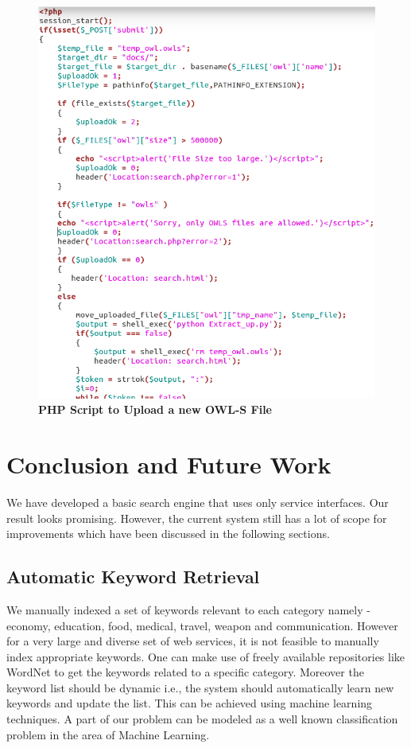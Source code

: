 \documentclass[12pt, twoside]{book}
\begin{document}
\begin{figure}[h]
 \centering
 \includegraphics[width=\textwidth]{pics/upload.png}
 \caption{\textbf{PHP Script to Upload a new OWL-S File}}
 \label{fig: upload}
\end{figure}


\chapter{Conclusion and Future Work}
We have developed a basic search engine that uses only service interfaces. Our result looks promising. However, the current system still has a lot of scope for improvements which have been discussed in the following sections.
\section{Automatic Keyword Retrieval}
We manually indexed a set of keywords relevant to each category namely - economy, education, food, medical, travel, weapon and communication. However for a very large and diverse set of web services, it is not feasible to manually index appropriate keywords. One can make use of freely available repositories like WordNet to get the keywords related to a specific category. Moreover the keyword list should be dynamic i.e., the system should automatically learn new keywords and update the list. This can be achieved using machine learning techniques. A part of our problem can be modeled as a well known classification problem in the area of Machine Learning.
\end{document}
